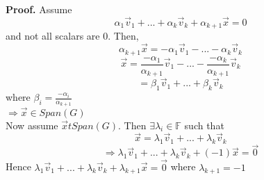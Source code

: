\documentclass [12pt]{article}
\begin{document}
\noindent\textbf{Proof. }Assume
\[\alpha_1\overrightarrow{v}_1+...+\alpha_k\overrightarrow{v}_k+\alpha_{k+1}\overrightarrow{x}=0\]
and not all scalars are 0. Then,
\[\alpha_{k+1}\overrightarrow{x}=-\alpha_1\overrightarrow{v}_1-...-\alpha_k\overrightarrow{v}_k\]
\[\overrightarrow{x}=\frac{-\alpha_1}{\alpha_{k+1}}\overrightarrow{v}_1-...-\frac{-\alpha_k}{\alpha_{k+1}}\overrightarrow{v}_k\]
\[=\beta_1\overrightarrow{v}_1+...+\beta_k\overrightarrow{v}_k\]
where $\beta_i=\frac{-\alpha_i}{\alpha_{k+1}}$\\
$\Rightarrow\overrightarrow{x}\in Span(G)$\\
Now assume $\overrightarrow{x}tSpan(G)$. Then $\exists\lambda_i\in\mathbb{F}$ such that 
\[\overrightarrow{x}=\lambda_1\overrightarrow{v}_1+...+\lambda_k\overrightarrow{v}_k\]
\[\Rightarrow\lambda_1\overrightarrow{v}_1+...+\lambda_k\overrightarrow{v}_k+(-1)\overrightarrow{x}=\overrightarrow{0}\]
Hence $\lambda_1\overrightarrow{v}_1+...+\lambda_k\overrightarrow{v}_k+\lambda_{k+1}\overrightarrow{x}=\overrightarrow{0}$ where $\lambda_{k+1}=-1$
\pagebreak
\end{document}

